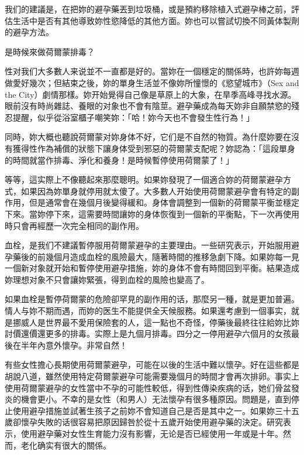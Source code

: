 \documentclass[12pt,UTF8]{ctexbook}
\begin{document}
我们的建議是，在把妳的避孕藥丟到垃圾桶，或是預約移除植入式避孕棒之前，評估生活中是否有其他導致妳性慾降低的其他方面。妳也可以嘗試切換不同黃体製劑的避孕方法。





是時候來做荷爾蒙排毒？





性对我们大多數人来说並不一直都是好的。當妳在一個穩定的關係時，也許妳每週做愛好幾次；但結束之後，妳的單身生活並不像妳所憧憬的《慾望城市》（Sex and the City）劇情那樣。妳开始覺得自己像是草原上的大象，在旱季高峰寻找水源。眼前沒有時尚雜誌、養眼的对象也不會有陰莖。避孕藥成為每天妳非自願禁慾的殘忍提醒，似乎從浴室櫃子嘲笑妳：「哈！妳今天也不會發生性行為！」

同時，妳大概也聽說荷爾蒙对妳身体不好，它们是不自然的物質。為什麼妳要在沒有獲得性作為補償的狀態下讓身体受到邪惡的荷爾蒙支配呢？妳認為：「這段單身的時間就當作排毒、淨化和養身！是時候暫停使用荷爾蒙了！」

等等，這实際上不像聽起來那麼聰明。如果妳發現了一個適合妳的荷爾蒙避孕方式，如果因為妳單身就停用就太傻了。大多數人开始使用荷爾蒙避孕會有特定的副作用，但是通常會在幾個月後變得緩和。身体會調整到一個新的荷爾蒙平衡並穩定下來。當妳停下來，這需要時間讓妳的身体恢復到一個新的平衡點，下一次再使用時只會再經歷一次完全相同的副作用。

血栓，是我们不建議暫停服用荷爾蒙避孕的主要理由。一些研究表示，开始服用避孕藥後的前幾個月造成血栓的風險最大，隨著時間的推移急劇下降。如果妳每一見一個新对象就开始和暫停使用避孕措施，妳的身体不會有時間回到平衡。結果造成妳理想对象不只會讓妳緊張，得到血栓的風險也變高了。

如果血栓是暫停荷爾蒙的危險卻罕見的副作用的话，那麼另一種，就是更加普遍。情人与妳不期而遇，而妳的医生不能提供全天候服務。如果還考慮到一個事实，就是挪威人是世界最不愛用保險套的人，這一點也不奇怪，停藥後最終往往給妳比妳討價還價還更多的排毒。实際上是九個月排毒。四分之一停用避孕六個月的女孩最後在半年內意外懷孕。非常自然！

有些女性擔心長期使用荷爾蒙避孕，可能在以後的生活中難以懷孕。好在這些都是胡說八道，雖然使用特定荷爾蒙避孕可能需要幾個月的時間才會再次排卵。事实上使用荷爾蒙避孕的女性當中不孕的可能性較低，得到性傳染疾病的话，她们骨盆發炎的機會更小。不幸的是女性（和男人）无法懷孕有很多種原因。問題是，直到停止使用避孕措施並試著生孩子之前妳不會知道自己是否是其中之一。如果妳三十五歲卻懷孕失敗的话很容易把原因歸咎於從十五歲开始使用避孕藥的決定。研究表示，使用避孕藥对女性生育能力沒有影響，无论是否已經使用一年或是十年。然而，老化确实有很大的關係。
\end{document}
